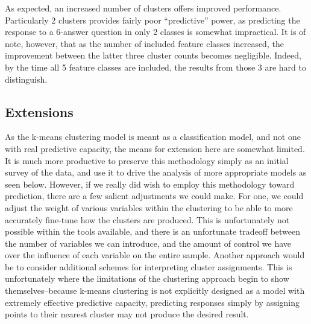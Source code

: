 As expected, an increased number of clusters offers improved performance. Particularly 2 clusters provides fairly poor ``predictive'' power, as predicting the response to a 6-answer question in only 2 classes is somewhat impractical. It is of note, however, that as the number of included feature classes increased, the improvement between the latter three cluster counts becomes negligible. Indeed, by the time all 5 feature classes are included, the results from those 3 are hard to distinguish.

\subsection{Extensions}

As the k-means clustering model is meant as a classification model, and not one with real predictive capacity, the means for extension here are somewhat limited. It is much more productive to preserve this methodology simply as an initial survey of the data, and use it to drive the analysis of more appropriate models as seen below. However, if we really did wish to employ this methodology toward prediction, there are a few salient adjustments we could make. For one, we could adjust the weight of various variables within the clustering to be able to more accurately fine-tune how the clusters are produced. This is unfortunately not possible within the tools available, and there is an unfortunate tradeoff between the number of variables we can introduce, and the amount of control we have over the influence of each variable on the entire sample. Another approach would be to consider additional schemes for interpreting cluster assignments. This is unfortunately where the limitations of the clustering approach begin to show themselves--because k-means clustering is not explicitly designed as a model with extremely effective predictive capacity, predicting responses simply by assigning points to their nearest cluster may not produce the desired result.
